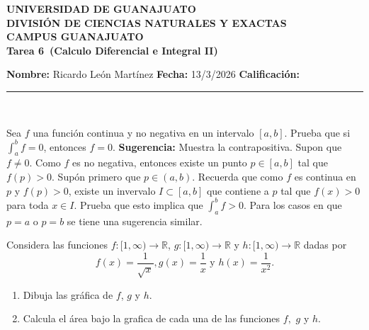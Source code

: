 \documentclass[12pt,a4paper]{article}
\newcommand{\alumno}{Ricardo León Martínez}
\newcommand{\materia}{Calculo Diferencial e Integral II}
\newcommand{\tarea}{Tarea 6}
\newcommand{\fecha}{13/3/2026}
\begin{document}
    \begin{center}
    {\large\textbf{UNIVERSIDAD DE GUANAJUATO}}\\[0.3cm]
    {\normalsize\textbf{DIVISIÓN DE CIENCIAS NATURALES Y EXACTAS}}\\
    {\normalsize\textbf{CAMPUS GUANAJUATO}}\\[1cm]

    {\Large\textbf{\tarea\ (\materia)}}\\[1cm]
    \end{center}

    \textbf{Nombre:} \alumno \hfill 
    \textbf{Fecha:} \fecha \hfill 
    \textbf{Calificación:} \rule{3cm}{0.4pt} \\[0.3cm]

    \begin{mdframed}[style=mdbluebox,frametitle={Ejercicio 1}]
        Sea $f$ una función continua y no negativa en un intervalo $[a,b]$. Prueba que
        si $\int_{a}^{b}f=0$, entonces $f=0$. \textbf{Sugerencia:} Muestra la contrapositiva.
        Supon que $f\neq0$. Como $f$ es no negativa, entonces existe un punto $p\in[a,b]$ tal
        que $f(p)\gt0$. Supón primero que $p\in(a,b)$. Recuerda que como $f$ es continua en $p$
        y $f(p)\gt0$, existe un invervalo $I\subset[a,b]$ que contiene a $p$ tal que $f(x)\gt0$
        para toda $x\in I$. Prueba que esto implica que $\int_{a}^{b}f\gt0$. Para los casos en que
        $p=a$ o $p=b$ se tiene una sugerencia similar.
    \end{mdframed}

    \begin{mdframed}[style=mdbluebox,frametitle={Ejercicio 2}]
        Considera las funciones $f:[1,\infty)\to\mathbb{R}$, $g:[1,\infty)\to\mathbb{R}$
        y $h:[1,\infty)\to\mathbb{R}$ dadas por
        \begin{equation*}
            f(x)=\frac{1}{\sqrt{x}}, g(x)=\frac{1}{x}\text{ y } h(x)=\frac{1}{x^{2}}.
        \end{equation*}
        \begin{enumerate}
            \item[(a)] Dibuja las gráfica de $f$, $g$ y $h$.
            \item[(b)] Calcula el área bajo la grafica de cada una de las funciones $f,$ $g$ y $h$.
        \end{enumerate}
    \end{mdframed}
\end{document}
